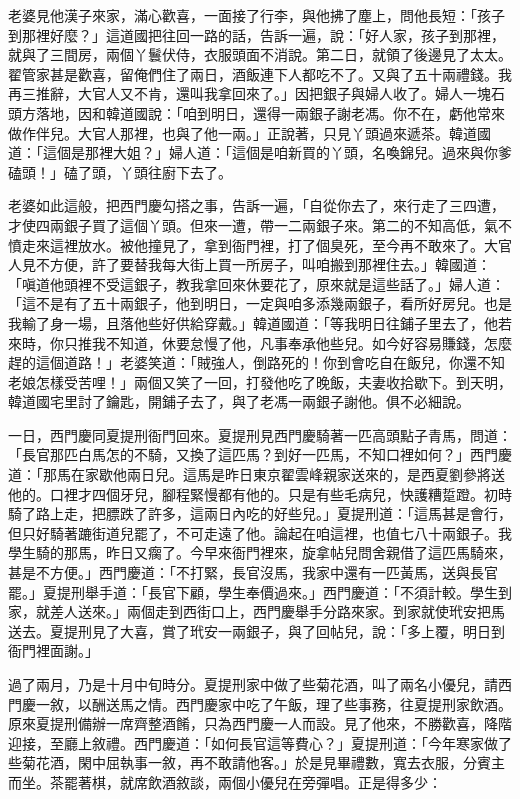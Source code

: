老婆見他漢子來家，滿心歡喜，一面接了行李，與他拂了塵上，問他長短：「孩子到那裡好麼？」這道國把往回一路的話，告訴一遍，說：「好人家，孩子到那裡，就與了三間房，兩個丫鬟伏侍，衣服頭面不消說。第二日，就領了後邊見了太太。翟管家甚是歡喜，留俺們住了兩日，酒飯連下人都吃不了。又與了五十兩禮錢。我再三推辭，大官人又不肯，還叫我拿回來了。」因把銀子與婦人收了。婦人一塊石頭方落地，因和韓道國說：「咱到明日，還得一兩銀子謝老馮。你不在，虧他常來做作伴兒。大官人那裡，也與了他一兩。」正說著，只見丫頭過來遞茶。韓道國道：「這個是那裡大姐？」婦人道：「這個是咱新買的丫頭，名喚錦兒。過來與你爹磕頭！」磕了頭，丫頭往廚下去了。

老婆如此這般，把西門慶勾搭之事，告訴一遍，「自從你去了，來行走了三四遭，才使四兩銀子買了這個丫頭。但來一遭，帶一二兩銀子來。第二的不知高低，氣不憤走來這裡放水。被他撞見了，拿到衙門裡，打了個臭死，至今再不敢來了。大官人見不方便，許了要替我每大街上買一所房子，叫咱搬到那裡住去。」韓國道： 「嗔道他頭裡不受這銀子，教我拿回來休要花了，原來就是這些話了。」婦人道：「這不是有了五十兩銀子，他到明日，一定與咱多添幾兩銀子，看所好房兒。也是我輸了身一場，且落他些好供給穿戴。」韓道國道：「等我明日往鋪子里去了，他若來時，你只推我不知道，休要怠慢了他，凡事奉承他些兒。如今好容易賺錢，怎麼趕的這個道路！」老婆笑道：「賊強人，倒路死的！你到會吃自在飯兒，你還不知老娘怎樣受苦哩！」兩個又笑了一回，打發他吃了晚飯，夫妻收拾歇下。到天明，韓道國宅里討了鑰匙，開鋪子去了，與了老馮一兩銀子謝他。俱不必細說。

一日，西門慶同夏提刑衙門回來。夏提刑見西門慶騎著一匹高頭點子青馬，問道：「長官那匹白馬怎的不騎，又換了這匹馬？到好一匹馬，不知口裡如何？」西門慶道：「那馬在家歇他兩日兒。這馬是昨日東京翟雲峰親家送來的，是西夏劉參將送他的。口裡才四個牙兒，腳程緊慢都有他的。只是有些毛病兒，快護糟踅蹬。初時騎了路上走，把膘跌了許多，這兩日內吃的好些兒。」夏提刑道：「這馬甚是會行，但只好騎著蹗街道兒罷了，不可走遠了他。論起在咱這裡，也值七八十兩銀子。我學生騎的那馬，昨日又瘸了。今早來衙門裡來，旋拿帖兒問舍親借了這匹馬騎來，甚是不方便。」西門慶道：「不打緊，長官沒馬，我家中還有一匹黃馬，送與長官罷。」夏提刑舉手道：「長官下顧，學生奉價過來。」西門慶道：「不須計較。學生到家，就差人送來。」兩個走到西街口上，西門慶舉手分路來家。到家就使玳安把馬送去。夏提刑見了大喜，賞了玳安一兩銀子，與了回帖兒，說：「多上覆，明日到衙門裡面謝。」

過了兩月，乃是十月中旬時分。夏提刑家中做了些菊花酒，叫了兩名小優兒，請西門慶一敘，以酬送馬之情。西門慶家中吃了午飯，理了些事務，往夏提刑家飲酒。原來夏提刑備辦一席齊整酒餚，只為西門慶一人而設。見了他來，不勝歡喜，降階迎接，至廳上敘禮。西門慶道：「如何長官這等費心？」夏提刑道：「今年寒家做了些菊花酒，閑中屈執事一敘，再不敢請他客。」於是見畢禮數，寬去衣服，分賓主而坐。茶罷著棋，就席飲酒敘談，兩個小優兒在旁彈唱。正是得多少：


